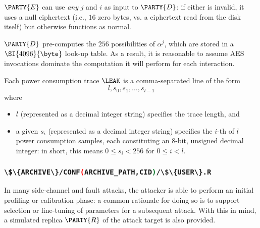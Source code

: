 \documentclass[crop={false},multi={true},tikz={true}]{standalone}
\begin{document}
\begin{itemize}
{      \noindent
      $\PARTY{E}$ can use {\em any} $j$ and $i$ as input to $\PARTY{D}$: if 
      either is invalid, it uses a null ciphertext (i.e., $16$ zero bytes, 
      vs. a ciphertext read from the disk itself) but otherwise functions 
      as normal.
\item $\PARTY{D}$ pre-computes the $256$ possibilities of $\alpha^j$, which 
      are stored in a $\SI{4096}{\byte}$ look-up table.  As a result, it is 
      reasonable to assume AES invocations dominate the computation it will
      perform for each interaction.
}{}%
\item Each power consumption trace $\LEAK$ is a comma-separated line of the 
      form
      \[
      l, s_0, s_1, \ldots, s_{l-1}
      \]
      where
         
      \begin{itemize}
      \item $l$
            (represented as a      decimal integer string)
            specifies the trace length, 
            and
      \item a given $s_i$
            (represented as a      decimal integer string)
            specifies the $i$-th of $l$ power consumption samples, each 
            constituting an $8$-bit, unsigned decimal integer: in short, 
            this means $0 \leq s_i < 256$ for $0 \leq i < l$.
      \end{itemize}
\end{itemize}

\subsubsection{\lstinline[language={bash}]|\$\{ARCHIVE\}/CONF(ARCHIVE_PATH,CID)/\$\{USER\}.R|}

In many side-channel and fault attacks, the attacker is able to perform an 
initial profiling or calibration phase: a common rationale for doing so is 
to support selection or fine-tuning of parameters for a subsequent attack.  
With this in mind, a simulated replica $\PARTY{R}$ of the attack target is 
also provided.
%
\end{document}
